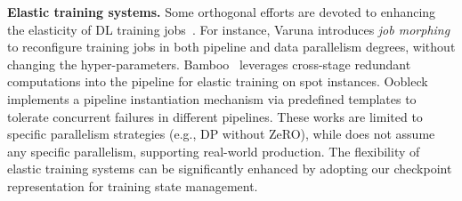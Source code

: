 \noindent \textbf{Elastic training systems.}
Some orthogonal efforts are devoted to enhancing the elasticity of DL training jobs~\cite{varuna, bamboo, easyscale, parcae, swift, oobleck}.
For instance, Varuna introduces \textit{job morphing} to reconfigure training jobs in both pipeline and data parallelism degrees, without changing the hyper-parameters.
Bamboo~\cite{bamboo} leverages cross-stage redundant computations into the pipeline for elastic training on spot instances.
Oobleck~\cite{oobleck} implements a pipeline instantiation mechanism via predefined templates to tolerate concurrent failures in different pipelines.
These works are limited to specific parallelism strategies (e.g., DP without ZeRO), while \sys{} does not assume any specific parallelism, supporting real-world production.
The flexibility of elastic training systems can be significantly enhanced by adopting our checkpoint representation for training state management.


